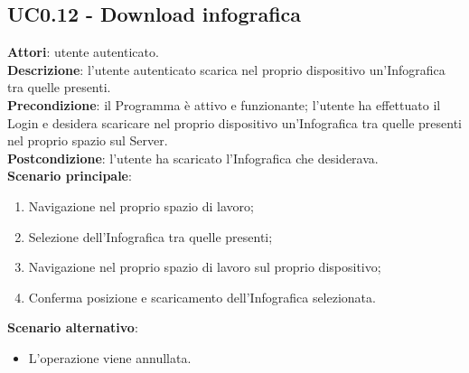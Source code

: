 \subsection{UC0.12 - Download infografica}{
	\label{uc0.12}
	\textbf{Attori}: utente autenticato.\\
	\textbf{Descrizione}: l'utente autenticato scarica nel proprio dispositivo un'Infografica tra quelle presenti.\\
	\textbf{Precondizione}: il Programma è attivo e funzionante; l'utente ha effettuato il Login e desidera scaricare nel proprio dispositivo un'Infografica tra quelle presenti nel proprio spazio sul Server.	\\
	\textbf{Postcondizione}: l'utente ha scaricato l'Infografica che desiderava.\\
	\textbf{Scenario principale}:
	\begin{enumerate}
		\item Navigazione nel proprio spazio di lavoro;
		\item Selezione dell'Infografica tra quelle presenti;
		\item Navigazione nel proprio spazio di lavoro sul proprio dispositivo;
		\item Conferma posizione e scaricamento dell'Infografica selezionata.
		\end{enumerate}	
	\textbf{Scenario alternativo}:
	\begin{itemize}
		\item L'operazione viene annullata.
	\end{itemize}
	}